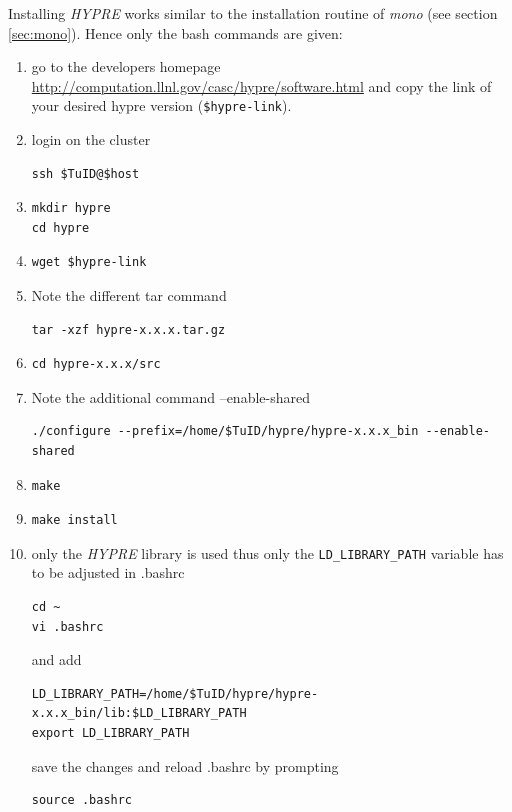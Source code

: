 Installing \emph{HYPRE} works similar to the installation routine of \emph{mono} (see section \ref{sec:mono}). Hence only the bash commands are given:
\begin{enumerate}
\item go to the developers homepage \url{http://computation.llnl.gov/casc/hypre/software.html} and copy the link of your desired hypre version (\verb|$hypre-link|). 
\item login on the cluster
\begin{verbatim}
ssh $TuID@$host
\end{verbatim}
\item 
\begin{verbatim}
mkdir hypre
cd hypre
\end{verbatim}
\item 
\begin{verbatim}
wget $hypre-link
\end{verbatim}
\item Note the different tar command
\begin{verbatim}
tar -xzf hypre-x.x.x.tar.gz
\end{verbatim}
\item 
\begin{verbatim}
cd hypre-x.x.x/src
\end{verbatim}
\item Note the additional command --enable-shared 
\begin{verbatim}
./configure --prefix=/home/$TuID/hypre/hypre-x.x.x_bin --enable-shared
\end{verbatim} 
\item 
\begin{verbatim}
make
\end{verbatim}
\item
\begin{verbatim}
make install
\end{verbatim} 
\item only the \emph{HYPRE} library is used thus only the \verb|LD_LIBRARY_PATH| variable has to be adjusted in .bashrc
\begin{verbatim}
cd ~
vi .bashrc
\end{verbatim}
and add
\begin{verbatim}
LD_LIBRARY_PATH=/home/$TuID/hypre/hypre-x.x.x_bin/lib:$LD_LIBRARY_PATH
export LD_LIBRARY_PATH
\end{verbatim}
save the changes and reload .bashrc by prompting
\begin{verbatim}
source .bashrc
\end{verbatim}
\end{enumerate} 

